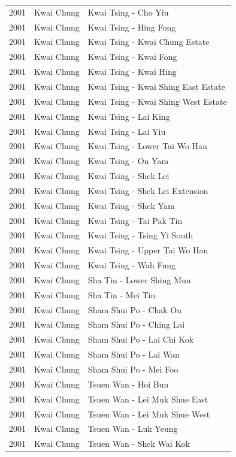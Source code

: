 \begin{longtable}{p{1.2cm}p{3cm}p{7cm}}
2001 & Kwai Chung & Kwai Tsing - Cho Yiu \\
2001 & Kwai Chung & Kwai Tsing - Hing Fong \\
2001 & Kwai Chung & Kwai Tsing - Kwai Chung Estate \\
2001 & Kwai Chung & Kwai Tsing - Kwai Fong \\
2001 & Kwai Chung & Kwai Tsing - Kwai Hing \\
2001 & Kwai Chung & Kwai Tsing - Kwai Shing East Estate \\
2001 & Kwai Chung & Kwai Tsing - Kwai Shing West Estate \\
2001 & Kwai Chung & Kwai Tsing - Lai King \\
2001 & Kwai Chung & Kwai Tsing - Lai Yiu \\
2001 & Kwai Chung & Kwai Tsing - Lower Tai Wo Hau \\
2001 & Kwai Chung & Kwai Tsing - On Yam \\
2001 & Kwai Chung & Kwai Tsing - Shek Lei \\
2001 & Kwai Chung & Kwai Tsing - Shek Lei Extension \\
2001 & Kwai Chung & Kwai Tsing - Shek Yam \\
2001 & Kwai Chung & Kwai Tsing - Tai Pak Tin \\
2001 & Kwai Chung & Kwai Tsing - Tsing Yi South \\
2001 & Kwai Chung & Kwai Tsing - Upper Tai Wo Hau \\
2001 & Kwai Chung & Kwai Tsing - Wah Fung \\
2001 & Kwai Chung & Sha Tin - Lower Shing Mun \\
2001 & Kwai Chung & Sha Tin - Mei Tin \\
2001 & Kwai Chung & Sham Shui Po - Chak On \\
2001 & Kwai Chung & Sham Shui Po - Ching Lai \\
2001 & Kwai Chung & Sham Shui Po - Lai Chi Kok \\
2001 & Kwai Chung & Sham Shui Po - Lai Wan \\
2001 & Kwai Chung & Sham Shui Po - Mei Foo \\
2001 & Kwai Chung & Tsuen Wan - Hoi Bun \\
2001 & Kwai Chung & Tsuen Wan - Lei Muk Shue East \\
2001 & Kwai Chung & Tsuen Wan - Lei Muk Shue West \\
2001 & Kwai Chung & Tsuen Wan - Luk Yeung \\
2001 & Kwai Chung & Tsuen Wan - Shek Wai Kok \\

\end{longtable}
